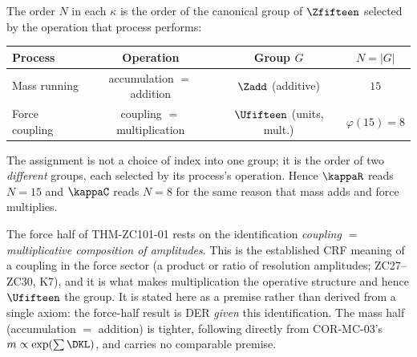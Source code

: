 \documentclass[12pt, a4paper]{article}
\begin{document}
\begin{formalbox}[title={THM-ZC101-01: Operation $\to$ Group (the index assignment)}]
The order $N$ in each $\kappa$ is the order of the canonical group of
$\Zfifteen$ selected by the operation that process performs:
\begin{center}
\renewcommand{\arraystretch}{1.3}
\begin{tabular}{lccc}
\toprule
\textbf{Process} & \textbf{Operation} & \textbf{Group $G$} & $N=|G|$ \\
\midrule
Mass running   & accumulation $=$ addition       & $\Zadd$ (additive)         & $15$ \\
Force coupling & coupling $=$ multiplication      & $\Ufifteen$ (units, mult.) & $\varphi(15)=8$ \\
\bottomrule
\end{tabular}
\end{center}
The assignment is not a choice of index into one group; it is the order of two
\emph{different} groups, each selected by its process's operation. Hence
$\kappaR$ reads $N=15$ and $\kappaC$ reads $N=8$ for the same reason that mass
adds and force multiplies.
\end{formalbox}

\begin{openqbox}[title={EXPOSED-ZC101-01: The stated premise}]
The force half of THM-ZC101-01 rests on the identification \emph{coupling
$=$ multiplicative composition of amplitudes}. This is the established CRF
meaning of a coupling in the force sector (a product or ratio of resolution
amplitudes; ZC27--ZC30, K7), and it is what makes multiplication the operative
structure and hence $\Ufifteen$ the group. It is stated here as a premise rather
than derived from a single axiom: the force-half result is DER \emph{given} this
identification. The mass half (accumulation $=$ addition) is tighter, following
directly from COR-MC-03's $m\propto\exp(\sum\DKL)$, and carries no comparable
premise.
\end{openqbox}

\end{document}
